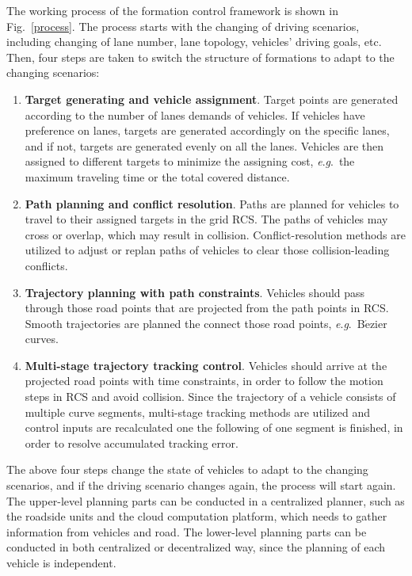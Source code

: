 \documentclass[journal]{IEEEtranTIE}
\newcommand{\eg}{\textit{e}.\textit{g}.}
\begin{document}
The working process of the formation control framework is shown in Fig.~\ref{process}. The process starts with the changing of driving scenarios, including changing of lane number, lane topology, vehicles' driving goals, etc. Then, four steps are taken to switch the structure of formations to adapt to the changing scenarios:
\begin{enumerate}
\item \textbf{Target generating and vehicle assignment}. Target points are generated according to the number of lanes demands of vehicles. If vehicles have preference on lanes, targets are generated accordingly on the specific lanes, and if not, targets are generated evenly on all the lanes. Vehicles are then assigned to different targets to minimize the assigning cost, \eg\, the maximum traveling time or the total covered distance. 
\item \textbf{Path planning and conflict resolution}. Paths are planned for vehicles to  travel to their assigned targets in the grid RCS. The paths of vehicles may cross or overlap, which may result in collision. Conflict-resolution methods are utilized to adjust or replan paths of vehicles to clear those collision-leading conflicts.
\item \textbf{Trajectory planning with path constraints}. Vehicles should pass through those road points that are projected from the path points in RCS. Smooth trajectories are planned the connect those road points, \eg\, B$\acute{\text{e}}$zier curves.
\item \textbf{Multi-stage trajectory tracking control}. Vehicles should arrive at the projected road points with time constraints, in order to follow the motion steps in RCS and avoid collision. Since the trajectory of a vehicle consists of multiple curve segments, multi-stage tracking methods are utilized and control inputs are recalculated one the following of one segment is finished, in order to resolve accumulated tracking error.
\end{enumerate}

The above four steps change the state of vehicles to adapt to the changing scenarios, and if the driving scenario changes again, the process will start again. The upper-level planning parts can be conducted in a centralized planner, such as the roadside units and the cloud computation platform, which needs to gather information from vehicles and road. The lower-level planning parts can be conducted in both centralized or decentralized way, since the planning of each vehicle is independent.
\end{document}
